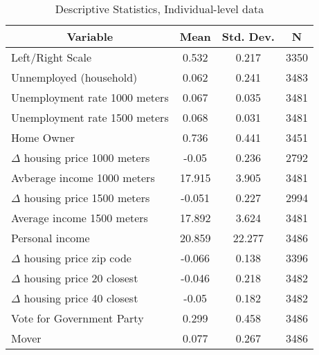 
\begin{table}[htbp]\centering \caption{Descriptive Statistics, Individual-level data \label{sumstat}}
\begin{tabular}{l c c  c}\hline\hline
\multicolumn{1}{c}{\textbf{Variable}} & \textbf{Mean}
 & \textbf{Std. Dev.} & \textbf{N}\\ \hline
Left/Right Scale & 0.532 & 0.217  & 3350\\
Unnemployed (household) & 0.062 & 0.241  & 3483\\
Unemployment rate 1000 meters & 0.067 & 0.035  & 3481\\
Unemployment rate 1500 meters & 0.068 & 0.031  & 3481\\
Home Owner & 0.736 & 0.441  & 3451\\
$\Delta$ housing price 1000 meters & -0.05 & 0.236  & 2792\\
Avberage income 1000 meters & 17.915 & 3.905  & 3481\\
$\Delta$ housing price 1500 meters & -0.051 & 0.227  & 2994\\
Average income 1500 meters & 17.892 & 3.624  & 3481\\
Personal income & 20.859 & 22.277  & 3486\\
$\Delta$ housing price zip code & -0.066 & 0.138  & 3396\\
$\Delta$ housing price 20 closest & -0.046 & 0.218  & 3482\\
$\Delta$ housing price 40 closest & -0.05 & 0.182  & 3482\\
Vote for Government Party & 0.299 & 0.458  & 3486\\
Mover & 0.077 & 0.267  & 3486\\
\hline\end{tabular}
\end{table}
